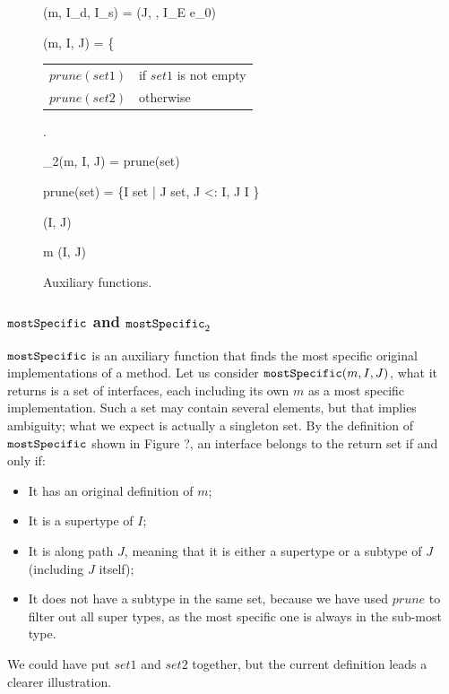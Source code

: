 \begin{figure}[t]
	\begin{mathpar}
		{\mbody(m, I_d, I_s) = (J,  \; , I_E \; e_0)}
	
	{\mostSpecific(m, I, J) = \left\{{\begin{tabular}{ll}
				$prune(set1)$ & if $set1$ is not empty \\ $prune(set2)$ & otherwise
			\end{tabular}}\right.}
	
		{\mostSpecific_2(m, I, J) = prune(set)}
	
	prune(set) = \{I \in set \; | \; \nexists J \in set, J <: I, J \neq I \}
	
	{\ext(I, J)}
	
	{m \in \updateSet(I, J)}
	\end{mathpar}
	\caption{Auxiliary functions.}\label{fig:auxfunc}
\end{figure}

\subsubsection{$\texttt{mostSpecific}$ and $\texttt{mostSpecific}_2$}

$\texttt{mostSpecific}$ is an auxiliary function that finds the most specific original implementations of a method. Let us consider $\texttt{mostSpecific}(m, I, J)$, what it returns is a set of interfaces, each including its own $m$ as a most specific implementation. Such a set may contain several elements, but that implies ambiguity; what we expect is actually a singleton set. By the definition of $\texttt{mostSpecific}$ shown in Figure ?, an interface belongs to the return set if and only if:
\begin{itemize}
	\item It has an original definition of $m$;
	\item It is a supertype of $I$;
	\item It is along path $J$, meaning that it is either a supertype or a subtype of $J$ (including $J$ itself);
	\item It does not have a subtype in the same set, because we have used $prune$ to filter out all super types, as the most specific one is always in the sub-most type.
\end{itemize}
We could have put $set1$ and $set2$ together, but the current definition leads a clearer illustration.

